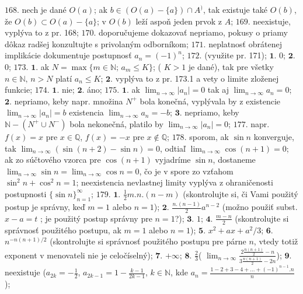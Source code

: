 $\boxed{168.}$ nech je dané $O(a)$; ak $b \in (O(a)-\lbrace a \rbrace )\cap A^{)} $, tak existuje také $O(b)$, že $O(b) \subset O(a)-\lbrace a \rbrace$; v $O(b)$ leží aspoň jeden prvok z $A$;
$\boxed{169.}$ neexistuje, vyplýva to z pr. 168;
$\boxed{170.}$ doporučujeme dokazovať nepriamo, pokusy o priamy dôkaz radšej konzultujte s privolaným odborníkom;
$\boxed{171.}$ neplatnosť obrátenej implikácie dokumentuje postupnosť $a_{n}=(-1)^{n}$;
$\boxed{172.}$ (využite pr. 171); $\boldsymbol{1.}$ $0$;
$\boldsymbol{2.}$ $0$;
$\boxed{173.}$ $\boldsymbol{1.}$  ak $N= \max \lbrace m \in \mathbb{N}; \, a_{m} \leq K\rbrace$; ( $K > 1$ je dané), tak pre všetky $n \in \mathbb{N}, \, n>N $ platí $a_{n} \leq K $;
$\boldsymbol{2.}$ vyplýva to z pr. 173.1 a vety o limite zloženej funkcie;
$\boxed{174.}$ $\boldsymbol{1.}$ nie; $\boldsymbol{2.}$ áno;
$\boxed{175.}$ $\boldsymbol{1.}$ ak $\lim_{n \to \infty} \vert a_n \vert =0 $  tak aj $\lim_{n \to \infty}  a_n =0 $;
$\boldsymbol{2.}$ nepriamo, keby napr. množina $N^{+}$ bola konečná, vyplývala by z existencie $\lim_{n \to \infty} \vert a_n \vert =b $ existencia $\lim_{n \to \infty}  a_n =-b $;
$\boldsymbol{3.}$ nepriamo, keby $\mathbb{N}-(N^{+}\cup N^{-}) $ bola nekonečná, platilo by $\lim_{n \to \infty} \vert a_n \vert =0 $;
$\boxed{177.}$ napr. $f(x)=x $ pre $x \in \mathbb{Q} $,  $f(x)=-x $ pre $x \notin \mathbb{Q} $;
$\boxed{178.}$ sporom, ak $\sin n $ konverguje, tak $\lim_{n \to \infty} (\sin (n+2)-\sin n) =0 $, odtiaľ $\lim_{n \to \infty} \cos (n+1) =0 $; ak zo súčtového vzorca pre $\cos (n+1)$ vyjadríme $\sin n$, dostaneme $\lim_{n \to \infty} \sin n = \lim_{n \to \infty} \cos n =0 $, čo je v spore zo vzťahom $\sin^{2} n + \cos ^{2} n =1$;
neexistencia nevlastnej limity vyplýva z ohraničenosti postupnosti $\lbrace \sin n \rbrace _{n=1} ^{\infty}$;
$\boxed{179.}$ $\boldsymbol{1.}$ $\frac{1}{2} m.n.(n-m)$ (skontrolujte si, či Vami použitý postup je správny, keď $m=1$ alebo $n=1$);
$\boldsymbol{2.}$ $\frac{n.(n-1)}{2} a^{n-2}$ (možno použiť subst. $x-a=t$ ; je použitý postup správny pre $n=1$?);
$\boldsymbol{3.}$ $1 $;
$\boldsymbol{4.}$ $\frac{m-n}{2} $ (skontrolujte si správnosť použitého postupu, ak  $m=1$ alebo $n=1$);
$\boldsymbol{5.}$ $x^{2}+ax+a^{2}/3 $;
$\boldsymbol{6.}$ $n^{-n(n+1)/2}$ (skontrolujte si správnosť použitého postupu pre párne $n$, vtedy totiž exponent v menovateli nie je celočíselný);
$\boldsymbol{7.}$ $+\infty$;
$\boldsymbol{8.}$ $ \frac{2}{3}$( $\lim_{n \to \infty} \frac{2\frac{n(n+1)}{2}-n}{3\frac{n(n+1)}{2}-2n} $); 
$\boldsymbol{9.}$ neexistuje ($a_{2k}=-\frac{1}{2}$, $a_{2k-1}=1-\frac{k-1}{2k-1}$, $k\in \mathbb{N}$, kde $a_{n}=\frac{1-2+3-4+...+(-1)^{n-1}.n}{n}$);
